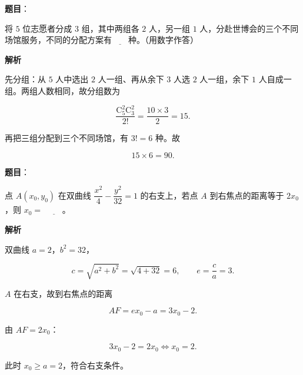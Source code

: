 \begin{answer}

\textbf{题目}：

将 $5$ 位志愿者分成 $3$ 组，其中两组各 $2$ 人，另一组 $1$ 人，分赴世博会的三个不同场馆服务，不同的分配方案有$\underline{\qquad}$种。（用数字作答）

\textbf{解析}

先分组：从 $5$ 人中选出 $2$ 人一组、再从余下 $3$ 人选 $2$ 人一组，余下 $1$ 人自成一组。两组人数相同，故分组数为

\nopagebreak[4]
\[\frac{\mathrm C_5^2\mathrm C_3^2}{2!}=\frac{10\times3}2=15.\]

再把三组分配到三个不同场馆，有 $3!=6$ 种。故

\nopagebreak[4]
\[15\times6=90.\]


\end{answer}
\begin{answer}

\textbf{题目}：

点 $A(x_0,y_0)$ 在双曲线 $\dfrac{x^2}{4}-\dfrac{y^2}{32}=1$ 的右支上，若点 $A$ 到右焦点的距离等于 $2x_0$，则 $x_0=$ $\underline{\qquad}$。

\textbf{解析}

双曲线 $a=2$，$b^2=32$，

\nopagebreak[4]
\[c=\sqrt{a^2+b^2}=\sqrt{4+32}=6,\qquad e=\frac ca=3.\]

$A$ 在右支，故到右焦点的距离

\nopagebreak[4]
\[AF=ex_0-a=3x_0-2.\]

由 $AF=2x_0$：

\nopagebreak[4]
\[3x_0-2=2x_0\iff x_0=2.\]

此时 $x_0\geqslant a=2$，符合右支条件。


\end{answer}
